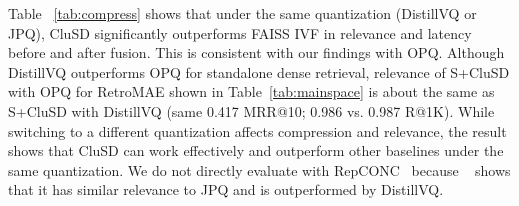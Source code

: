 Table ~\ref{tab:compress} shows that 
under the same quantization (DistillVQ or JPQ), CluSD significantly outperforms FAISS IVF in relevance and latency 
before and after fusion.  This is consistent with our findings with OPQ.
Although DistillVQ outperforms OPQ for standalone dense retrieval,
relevance of S+CluSD with OPQ for RetroMAE shown in  Table~\ref{tab:mainspace} is about the same  as S+CluSD with DistillVQ
(same 0.417 MRR@10;  0.986 vs. 0.987 R@1K).  
While switching to a different quantization affects compression and  relevance, 
the result shows that CluSD can work effectively and  outperform other baselines under the same quantization. 
We do not directly evaluate with RepCONC~\cite{2022WSDM-Zhan-RepCONC}
because ~\cite{Xiao2022Distill-VQ} shows that it has similar relevance to JPQ
and is outperformed by DistillVQ.

